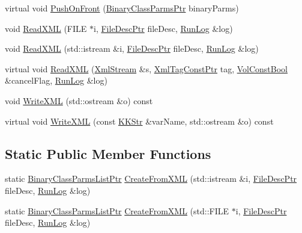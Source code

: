 \begin{DoxyCompactItemize}
\item 
virtual void \hyperlink{class_k_k_m_l_l_1_1_binary_class_parms_list_ae516ec1e631b0c6cead68b0fcf02dec6}{Push\+On\+Front} (\hyperlink{namespace_k_k_m_l_l_aca399c0744e11553270ffaca507cfee7}{Binary\+Class\+Parms\+Ptr} binary\+Parms)
\item 
void \hyperlink{class_k_k_m_l_l_1_1_binary_class_parms_list_abe73055cbd706b00dc2a178e42ddc6be}{Read\+X\+ML} (F\+I\+LE $\ast$i, \hyperlink{namespace_k_k_m_l_l_aa0d0b6ab4ec18868a399b8455b05d914}{File\+Desc\+Ptr} file\+Desc, \hyperlink{class_k_k_b_1_1_run_log}{Run\+Log} \&log)
\item 
void \hyperlink{class_k_k_m_l_l_1_1_binary_class_parms_list_a8bb4b8daae8221e791463ccdb7c00af3}{Read\+X\+ML} (std\+::istream \&i, \hyperlink{namespace_k_k_m_l_l_aa0d0b6ab4ec18868a399b8455b05d914}{File\+Desc\+Ptr} file\+Desc, \hyperlink{class_k_k_b_1_1_run_log}{Run\+Log} \&log)
\item 
virtual void \hyperlink{class_k_k_m_l_l_1_1_binary_class_parms_list_a55e0350c7cb8196824b98bd3b5fde906}{Read\+X\+ML} (\hyperlink{class_k_k_b_1_1_xml_stream}{Xml\+Stream} \&s, \hyperlink{namespace_k_k_b_a5f1b0b1667d79fec26deeff10c43df23}{Xml\+Tag\+Const\+Ptr} tag, \hyperlink{namespace_k_k_b_a7d390f568e2831fb76b86b56c87bf92f}{Vol\+Const\+Bool} \&cancel\+Flag, \hyperlink{class_k_k_b_1_1_run_log}{Run\+Log} \&log)
\item 
void \hyperlink{class_k_k_m_l_l_1_1_binary_class_parms_list_a8ba8095904b370032cd0272f35c83645}{Write\+X\+ML} (std\+::ostream \&o) const 
\item 
virtual void \hyperlink{class_k_k_m_l_l_1_1_binary_class_parms_list_ad9196ef1c9765d596934760a73624096}{Write\+X\+ML} (const \hyperlink{class_k_k_b_1_1_k_k_str}{K\+K\+Str} \&var\+Name, std\+::ostream \&o) const 
\end{DoxyCompactItemize}
\subsection*{Static Public Member Functions}
\begin{DoxyCompactItemize}
\item 
static \hyperlink{class_k_k_m_l_l_1_1_binary_class_parms_list_acdd9df4b1cfdbd470a7937a935b8eef6}{Binary\+Class\+Parms\+List\+Ptr} \hyperlink{class_k_k_m_l_l_1_1_binary_class_parms_list_a01daa7a12c475be9c125967b7aeb6510}{Create\+From\+X\+ML} (std\+::istream \&i, \hyperlink{namespace_k_k_m_l_l_aa0d0b6ab4ec18868a399b8455b05d914}{File\+Desc\+Ptr} file\+Desc, \hyperlink{class_k_k_b_1_1_run_log}{Run\+Log} \&log)
\item 
static \hyperlink{class_k_k_m_l_l_1_1_binary_class_parms_list_acdd9df4b1cfdbd470a7937a935b8eef6}{Binary\+Class\+Parms\+List\+Ptr} \hyperlink{class_k_k_m_l_l_1_1_binary_class_parms_list_afad6823ba199a234ba792e8fcc3eee23}{Create\+From\+X\+ML} (std\+::\+F\+I\+LE $\ast$i, \hyperlink{namespace_k_k_m_l_l_aa0d0b6ab4ec18868a399b8455b05d914}{File\+Desc\+Ptr} file\+Desc, \hyperlink{class_k_k_b_1_1_run_log}{Run\+Log} \&log)
\end{DoxyCompactItemize}
